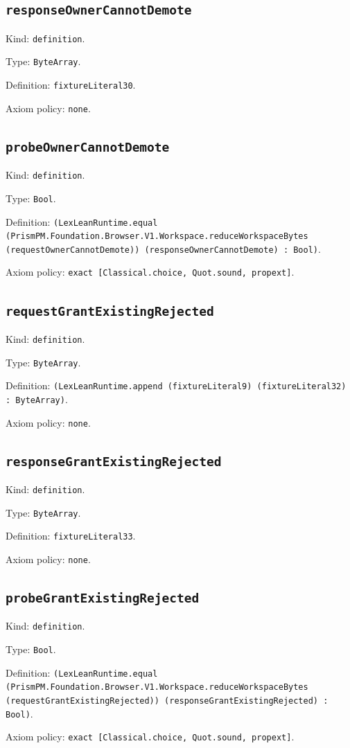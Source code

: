 \documentclass[11pt]{article}
\begin{document}
\subsection*{\texttt{responseOwnerCannotDemote}}
\noindent Kind: \texttt{definition}.\par
\noindent Type: \texttt{ByteArray}.\par
\noindent Definition: \texttt{fixtureLiteral30}.\par
\noindent Axiom policy: \texttt{none}.\par
\subsection*{\texttt{probeOwnerCannotDemote}}
\noindent Kind: \texttt{definition}.\par
\noindent Type: \texttt{Bool}.\par
\noindent Definition: \texttt{(LexLeanRuntime.equal (PrismPM.Foundation.Browser.V1.Workspace.reduceWorkspaceBytes (requestOwnerCannotDemote)) (responseOwnerCannotDemote) : Bool)}.\par
\noindent Axiom policy: \texttt{exact [Classical.choice, Quot.sound, propext]}.\par
\subsection*{\texttt{requestGrantExistingRejected}}
\noindent Kind: \texttt{definition}.\par
\noindent Type: \texttt{ByteArray}.\par
\noindent Definition: \texttt{(LexLeanRuntime.append (fixtureLiteral9) (fixtureLiteral32) : ByteArray)}.\par
\noindent Axiom policy: \texttt{none}.\par
\subsection*{\texttt{responseGrantExistingRejected}}
\noindent Kind: \texttt{definition}.\par
\noindent Type: \texttt{ByteArray}.\par
\noindent Definition: \texttt{fixtureLiteral33}.\par
\noindent Axiom policy: \texttt{none}.\par
\subsection*{\texttt{probeGrantExistingRejected}}
\noindent Kind: \texttt{definition}.\par
\noindent Type: \texttt{Bool}.\par
\noindent Definition: \texttt{(LexLeanRuntime.equal (PrismPM.Foundation.Browser.V1.Workspace.reduceWorkspaceBytes (requestGrantExistingRejected)) (responseGrantExistingRejected) : Bool)}.\par
\noindent Axiom policy: \texttt{exact [Classical.choice, Quot.sound, propext]}.\par
\end{document}
